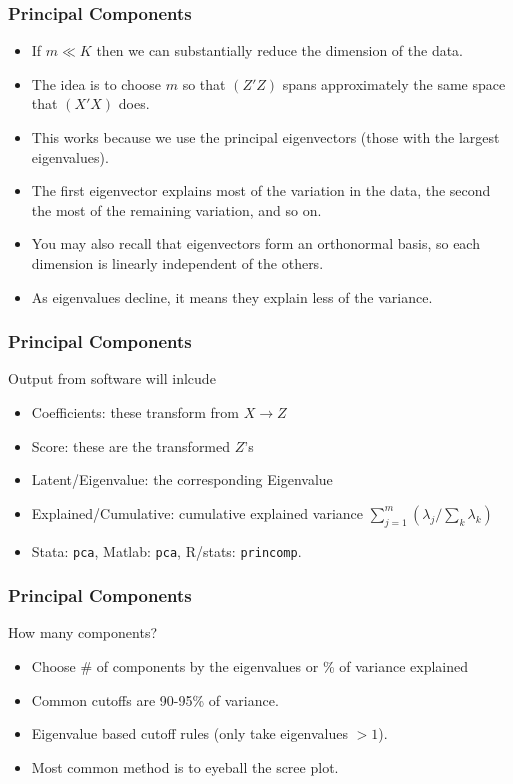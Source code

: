 \documentclass[xcolor=pdftex,dvipsnames,table,mathserif,aspectratio=169]{beamer}
\begin{document}
\begin{frame}
\frametitle{Principal Components}
\begin{itemize}
\item If $m \ll K$ then we can substantially reduce the dimension of the data.
\item The idea is to choose $m$ so that $(Z'Z)$ spans approximately the same space that $(X'X)$ does.
\item This works because we use the \alert{principal eigenvectors} (those with the largest eigenvalues).
\item The first eigenvector explains most of the variation in the data, the second the most of the remaining variation, and so on.
\item You may also recall that eigenvectors form an \alert{orthonormal basis}, so each dimension is linearly independent of the others.
\item As eigenvalues decline, it means they explain less of the variance.
\end{itemize}
\end{frame}

\begin{frame}
\frametitle{Principal Components}
Output from software will inlcude
\begin{itemize}
\item Coefficients: these transform from $X\rightarrow Z$
\item Score: these are the transformed $Z$'s
\item Latent/Eigenvalue: the corresponding Eigenvalue
\item Explained/Cumulative: cumulative explained variance $ \sum_{j=1}^m( \lambda_j / \sum_k \lambda_k)$
\item Stata: \texttt{pca}, Matlab: \texttt{pca}, R/stats: \texttt{princomp}.
\end{itemize}
\end{frame}

\begin{frame}
\frametitle{Principal Components}
How many components?
\begin{itemize}
\item Choose \# of components by the eigenvalues or \% of variance explained
\item Common cutoffs are 90-95\% of variance.
\item Eigenvalue based cutoff rules (only take eigenvalues $ > 1$).
\item Most common method is to eyeball the scree plot.
\end{itemize}
\end{frame}
\end{document}
